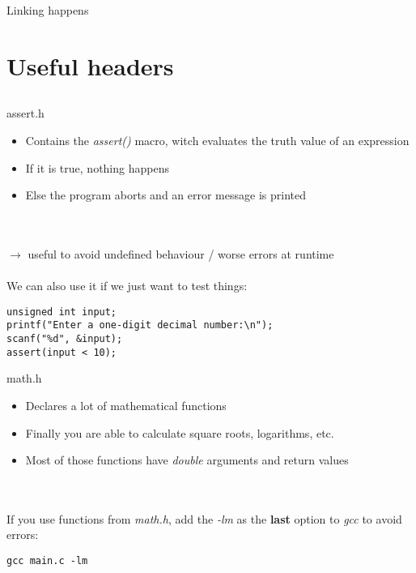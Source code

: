 \begin{frame}{Linking happens}
	\centering
\end{frame}

\section{Useful headers}
\subsection{}
\begin{frame}[fragile]{assert.h}
	 \begin{itemize}
	 	\item Contains the \textit{assert()} macro, witch evaluates the truth value of an expression
	 	\item If it is true, nothing happens
	 	\item Else the program aborts and an error message is printed
	 \end{itemize} \ \\ \ \\
	 $\rightarrow$ useful to avoid undefined behaviour / worse errors at runtime \\ \ \\
	 We can also use it if we just want to test things:
	 \begin{lstlisting}[numbers=none]
unsigned int input;
printf("Enter a one-digit decimal number:\n");
scanf("%d", &input);
assert(input < 10);
\end{lstlisting}
\end{frame}
\begin{frame}[fragile]{math.h}
	\begin{itemize}
		\item Declares a lot of mathematical functions
		\item Finally you are able to calculate square roots, logarithms, etc.
		\item Most of those functions have \textit{double} arguments and return values
	\end{itemize} \ \\ \ \\
	If you use functions from \textit{math.h}, add the \textit{-lm} as the \textbf{last} option to \textit{gcc} to avoid errors:
	\begin{lstlisting}[numbers=none]
gcc main.c -lm
\end{lstlisting}
\end{frame}
